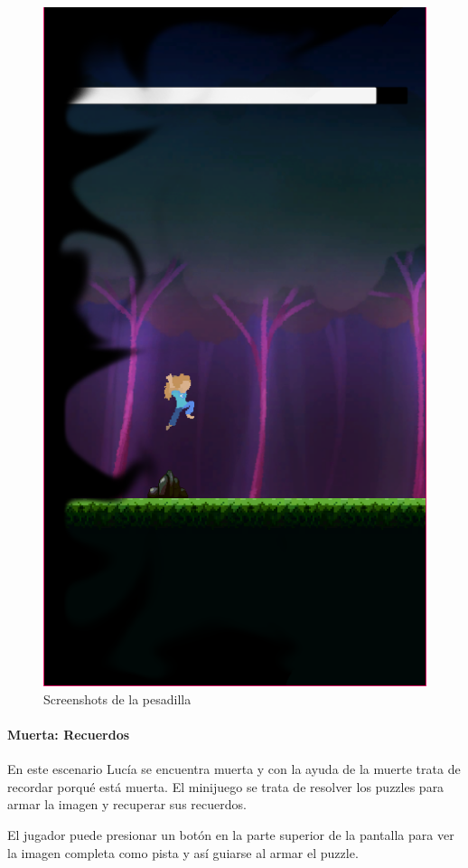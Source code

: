 \begin{figure}[h]
\begin{minipage}{0.45\textwidth}
\begin{flushright}
	   		\includegraphics[scale=.5]{imgs/screenshot06.png}
		\end{flushright}
	\end{minipage}
	\caption{Screenshots de la pesadilla}
	\label{multifig:pesadilla}
\end{figure}

\newpage
\paragraph{Muerta: Recuerdos}
En este escenario Lucía se encuentra muerta y con la ayuda de la muerte trata de recordar porqué está muerta. El minijuego se trata de resolver los puzzles para armar la imagen y recuperar sus recuerdos.

El jugador puede presionar un botón en la parte superior de la pantalla para ver la imagen completa como pista y así guiarse al armar el puzzle.

